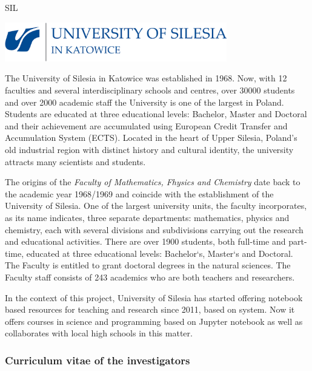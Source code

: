 \begin{sitedescription}{SIL}\label{desc:SIL}

\begin{center}
\includegraphics[height=1.7cm]{Participants/Logos/Silesia.png}
\end{center}

The University of Silesia in Katowice was established in 1968. Now,
with 12 faculties and several interdisciplinary schools and centres,
over 30000 students and over 2000 academic staff the University is one
of the largest in Poland. Students are educated at three educational
levels: Bachelor, Master and Doctoral and their achievement are
accumulated using European Credit Transfer and Accumulation System
(ECTS). Located in the heart of Upper Silesia, Poland's old industrial
region with distinct history and cultural identity, the university
attracts many scientists and students.

The origins of the {\em Faculty of Mathematics, Fhysics and Chemistry} date
back to the academic year 1968/1969 and coincide with the
establishment of the University of Silesia. One of the largest
university units, the faculty incorporates, as its name indicates,
three separate departments: mathematics, physics and chemistry, each
with several divisions and subdivisions carrying out the research and
educational activities. There are over 1900 students, both full-time
and part-time, educated at three educational levels: Bachelor`s,
Master`s and Doctoral. The Faculty is entitled to grant doctoral
degrees in the natural sciences. The Faculty staff consists of 243
academics who are both teachers and researchers.


In the context of this project, University of Silesia has started offering notebook based resources for teaching and research since 2011, based on \Sage system. Now it offers courses in science and programming based on Jupyter notebook as well as collaborates with local high schools in this matter. 


\subsubsection*{Curriculum vitae of the investigators}





\end{sitedescription}
